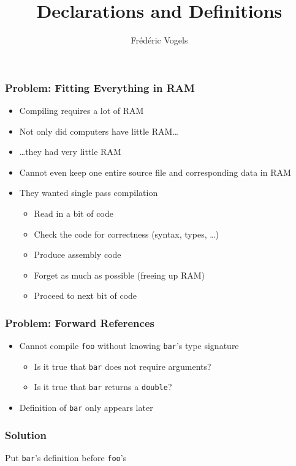 \documentclass{../ucll-slides}
\title{Declarations and Definitions}
\author{Fr\'ed\'eric Vogels}
\begin{document}
\begin{frame}
  \titlepage
\end{frame}


\begin{frame}
  \frametitle{Problem: Fitting Everything in RAM}
  \begin{itemize}
    \item Compiling requires a lot of RAM
    \item Not only did computers have little RAM\dots
    \item \dots they had very little RAM
    \item Cannot even keep one entire source file and corresponding data in RAM
    \item They wanted single pass compilation
      \begin{itemize}
        \item Read in a bit of code
        \item Check the code for correctness (syntax, types, \dots)
        \item Produce assembly code
        \item Forget as much as possible (freeing up RAM)
        \item Proceed to next bit of code
      \end{itemize}
  \end{itemize}
\end{frame}

\begin{frame}
  \frametitle{Problem: Forward References}
  \begin{itemize}
    \item Cannot compile {\tt foo} without knowing {\tt bar}'s type signature
          \begin{itemize}
            \item Is it true that {\tt bar} does not require arguments?
            \item Is it true that {\tt bar} returns a {\tt double}?
          \end{itemize}
    \item Definition of {\tt bar} only appears later
  \end{itemize}
\end{frame}

\begin{frame}
  \frametitle{Solution}
  \begin{center}
    Put {\tt bar}'s definition before {\tt foo}'s
  \end{center}
  \vskip5mm
\end{frame}
\end{document}
